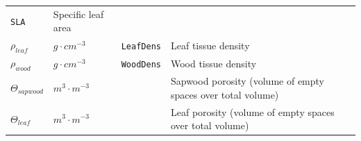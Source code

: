 \documentclass[]{book}
\begin{document}
\begin{longtable}[]{@{}llll@{}}
\begin{minipage}[t]{0.12\columnwidth}
\texttt{SLA}\strut
\end{minipage} & \begin{minipage}[t]{0.45\columnwidth}\raggedright\strut
Specific leaf area\strut
\end{minipage}\tabularnewline
\begin{minipage}[t]{0.11\columnwidth}\raggedright\strut
\(\rho_{leaf}\)\strut
\end{minipage} & \begin{minipage}[t]{0.10\columnwidth}\raggedright\strut
\(g \cdot cm^{-3}\)\strut
\end{minipage} & \begin{minipage}[t]{0.12\columnwidth}\raggedright\strut
\texttt{LeafDens}\strut
\end{minipage} & \begin{minipage}[t]{0.45\columnwidth}\raggedright\strut
Leaf tissue density\strut
\end{minipage}\tabularnewline
\begin{minipage}[t]{0.11\columnwidth}\raggedright\strut
\(\rho_{wood}\)\strut
\end{minipage} & \begin{minipage}[t]{0.10\columnwidth}\raggedright\strut
\(g \cdot cm^{-3}\)\strut
\end{minipage} & \begin{minipage}[t]{0.12\columnwidth}\raggedright\strut
\texttt{WoodDens}\strut
\end{minipage} & \begin{minipage}[t]{0.45\columnwidth}\raggedright\strut
Wood tissue density\strut
\end{minipage}\tabularnewline
\begin{minipage}[t]{0.11\columnwidth}\raggedright\strut
\(\Theta_{sapwood}\)\strut
\end{minipage} & \begin{minipage}[t]{0.10\columnwidth}\raggedright\strut
\(m^3 \cdot m^{-3}\)\strut
\end{minipage} & \begin{minipage}[t]{0.12\columnwidth}\raggedright\strut
\strut
\end{minipage} & \begin{minipage}[t]{0.45\columnwidth}\raggedright\strut
Sapwood porosity (volume of empty spaces over total volume)\strut
\end{minipage}\tabularnewline
\begin{minipage}[t]{0.11\columnwidth}\raggedright\strut
\(\Theta_{leaf}\)\strut
\end{minipage} & \begin{minipage}[t]{0.10\columnwidth}\raggedright\strut
\(m^3 \cdot m^{-3}\)\strut
\end{minipage} & \begin{minipage}[t]{0.12\columnwidth}\raggedright\strut
\strut
\end{minipage} & \begin{minipage}[t]{0.45\columnwidth}\raggedright\strut
Leaf porosity (volume of empty spaces over total volume)\strut
\end{minipage}\tabularnewline
\bottomrule
\end{longtable}
\end{document}

